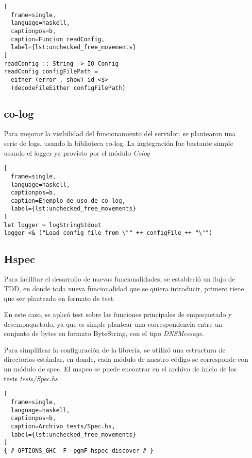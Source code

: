 \documentclass[6pt]{article}
\begin{document}
\begin{lstlisting}[
  frame=single,
  language=haskell,
  captionpos=b,
  caption=Funcion readConfig,
  label={lst:unchecked_free_movements}
]
readConfig :: String -> IO Config
readConfig configFilePath =
  either (error . show) id <$>
  (decodeFileEither configFilePath)
\end{lstlisting}

\subsection{co-log \cite{package-co-log}}

Para mejorar la visibilidad del funcionamiento del servidor, se
plantearon una serie de logs, usando la biblioteca co-log. La
ingtegración fue bastante simple usando el logger ya provisto
por el módulo \textit{Colog}

\begin{lstlisting}[
  frame=single,
  language=haskell,
  captionpos=b,
  caption=Ejemplo de uso de co-log,
  label={lst:unchecked_free_movements}
]
let logger = logStringStdout
logger <& ("Load config file from \"" ++ configFile ++ "\"")
\end{lstlisting}

\subsection{Hspec \cite{package-hspec}}

Para facilitar el desarrollo de nuevas funcionalidades, se estableció
un flujo de TDD, en donde toda nueva funcionalidad que se quiera
introducir, primero tiene que ser planteada en formato de test.

En este caso, se aplicó test sobre las funciones principales de
empaquetado y desempaquetado, ya que es simple plantear una
correspondencia entre un conjunto de bytes en formato ByteString, con
el tipo \textit{DNSMessage}.

Para simplificar la configuración de la librería, se utilizó una
estructura de directorios estándar, en donde, cada módulo de nuestro
código se corresponde con un módulo de spec. El mapeo se puede encontrar
en el archivo de inicio de los tests \textit{tests/Spec.hs}

\begin{lstlisting}[
  frame=single,
  language=haskell,
  captionpos=b,
  caption=Archivo tests/Spec.hs,
  label={lst:unchecked_free_movements}
]
{-# OPTIONS_GHC -F -pgmF hspec-discover #-}
\end{lstlisting}
\end{document}
